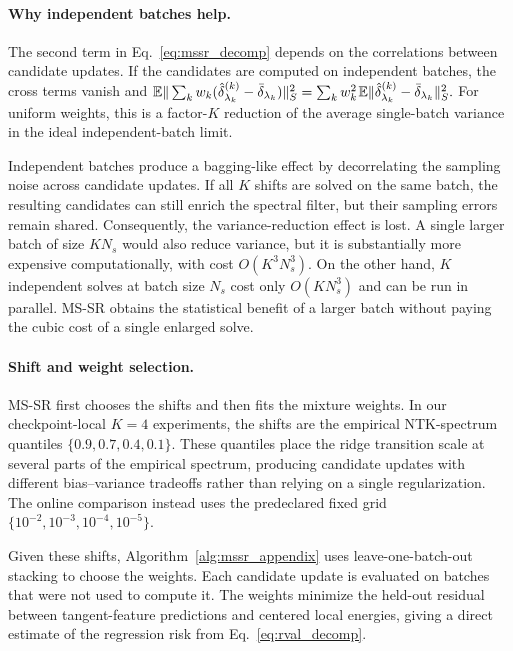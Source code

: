 \documentclass{article}
\newcommand{\Expect}{\mathbb{E}}
\begin{document}
\paragraph{Why independent batches help.}
\label{par:multi_batch}

The second term in Eq.~\eqref{eq:mssr_decomp} depends on the correlations
between candidate updates. If the candidates are computed on independent
batches, the cross terms vanish and
$
    \Expect
        \|
            \sum_k
            w_k
            (
                \hat\delta_{\lambda_k}^{(k)}
                -
                \bar\delta_{\lambda_k}
            )
        \|_S^2
    =
    \sum_k
    w_k^2
    \hspace{0.1em}
    \Expect
        \|
            \hat\delta_{\lambda_k}^{(k)}
            -
            \bar\delta_{\lambda_k}
        \|_S^2.
$
For uniform weights, this is a factor-\(K\) reduction of the average
single-batch variance in the ideal independent-batch limit.

Independent batches produce a bagging-like effect by decorrelating the sampling
noise across candidate updates. If all \(K\) shifts are solved on the same
batch, the resulting candidates can still enrich the spectral filter, but their
sampling errors remain shared. Consequently, the variance-reduction effect is lost.
A single larger batch of size \(KN_s\) would also reduce variance, but it is substantially more expensive
computationally, with cost \(O(K^3N_s^3)\). On the other hand,
\(K\) independent solves at batch size \(N_s\) cost only \(O(KN_s^3)\) and can
be run in parallel. MS-SR obtains the statistical benefit of a larger batch without paying the
cubic cost of a single enlarged solve.


\paragraph{Shift and weight selection.}
\label{par:mssr_weights}

MS-SR first chooses the shifts and then fits the mixture weights. In our
checkpoint-local \(K=4\) experiments, the shifts are the empirical NTK-spectrum
quantiles \(\{0.9,0.7,0.4,0.1\}\). These quantiles place the ridge transition
scale at several parts of the
empirical spectrum, producing candidate updates with different bias--variance
tradeoffs rather than relying on a single regularization. The online comparison
instead uses the predeclared fixed grid
\(\{10^{-2},10^{-3},10^{-4},10^{-5}\}\).

Given these shifts, Algorithm~\ref{alg:mssr_appendix} uses leave-one-batch-out stacking
to choose the weights. Each candidate update is evaluated on batches that were
not used to compute it. The weights minimize the held-out residual between
tangent-feature predictions and centered local energies, giving a direct
estimate of the regression risk from Eq.~\eqref{eq:rval_decomp}.
\end{document}
